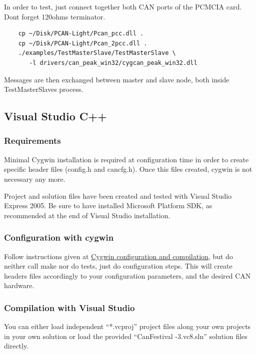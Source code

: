 \documentclass[12pt,english,a4paper]{book}
\begin{document}
In order to test, just connect together both CAN ports of the PCMCIA
card. Don{\textquotesingle}t forget 120ohms terminator.


\begin{verbatim}
	cp ~/Disk/PCAN-Light/Pcan_pcc.dll .
	cp ~/Disk/PCAN-Light/Pcan_2pcc.dll .
	./examples/TestMasterSlave/TestMasterSlave \
	   -l drivers/can_peak_win32/cygcan_peak_win32.dll
\end{verbatim}


Messages are then exchanged between master and slave node, both inside
TestMasterSlave{\textquotesingle}s process.

\subsection{Visual Studio C++}

\subsubsection{Requirements}

Minimal Cygwin installation is required at configuration time in order
to create specific header files (config.h and cancfg.h). Once this
files created, cygwin is not necessary any more.

Project and solution files have been created and tested with Visual
Studio Express 2005. Be sure to have installed Microsoft Platform
SDK, as recommended at the end of Visual Studio installation.


\subsubsection{Configuration with cygwin}

Follow instructions given at \hyperlink{Cygwin configuration and compilation}{Cygwin
configuration and compilation}, but do neither call make nor do tests,
just do configuration steps. This will create headers files accordingly
to your configuration parameters, and the desired CAN hardware.


\subsubsection{Compilation with Visual Studio}

You can either load independent {}``{*}.vcproj'' project files
along your own projects in your own solution or load the provided
{}``CanFestival -3.vc8.sln'' solution files directly.
\end{document}
